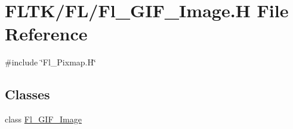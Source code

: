 \hypertarget{_fl___g_i_f___image_8_h}{}\section{F\+L\+T\+K/\+F\+L/\+Fl\+\_\+\+G\+I\+F\+\_\+\+Image.H File Reference}
\label{_fl___g_i_f___image_8_h}
{\ttfamily \#include \char`\"{}Fl\+\_\+\+Pixmap.\+H\char`\"{}}\newline
\subsection*{Classes}
\begin{DoxyCompactItemize}
\item 
class \hyperlink{class_fl___g_i_f___image}{Fl\+\_\+\+G\+I\+F\+\_\+\+Image}
\end{DoxyCompactItemize}
